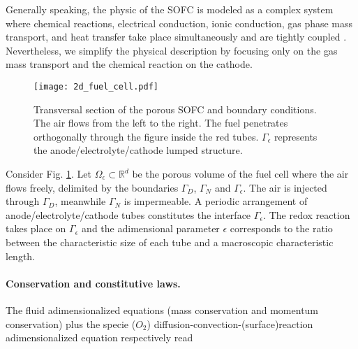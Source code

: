 \documentclass{article}
\newcommand{\Rbb} {\mathbb{R}}
\begin{document}
Generally speaking, the physic of the SOFC is modeled as a complex system where chemical reactions, electrical conduction, ionic conduction, gas phase mass transport, and heat transfer take place simultaneously and are tightly coupled \cite{hosseini2013cfd,hussain2006mathematical,danilov2009cfd}. Nevertheless, we simplify the physical description by focusing only on the gas mass transport and the chemical reaction on the cathode.
\begin{figure}[h]
\centering
\texttt{[image: 2d\_fuel\_cell.pdf]}
\caption{Transversal section of the porous SOFC and boundary conditions. The air flows from the left to the right. The fuel penetrates orthogonally through the figure inside the red tubes. $\Gamma_\epsilon$ represents the anode/electrolyte/cathode lumped structure.}\label{porous_medium}
\end{figure}


{Consider Fig. \ref{porous_medium}.} Let $\Omega_\epsilon \subset \Rbb^d$ be the porous volume of the fuel cell where the air flows freely, delimited by the boundaries $\Gamma_D$, $\Gamma_N$ and $\Gamma_{\epsilon}$. The air is injected through $\Gamma_D$, meanwhile $\Gamma_N$ is impermeable. A periodic arrangement of anode/electrolyte/cathode tubes constitutes the interface $\Gamma_\epsilon$. The redox reaction takes place on $\Gamma_\epsilon$ and the adimensional parameter $\epsilon$ corresponds to the ratio between the characteristic size of each tube and a macroscopic characteristic length. 

\paragraph{Conservation and constitutive laws.}
The fluid adimensionalized equations (mass conservation and momentum conservation) plus the specie ($O_2$) diffusion-convection-(surface)reaction adimensionalized equation respectively read \cite{auriault2010homogenization}
\end{document}
